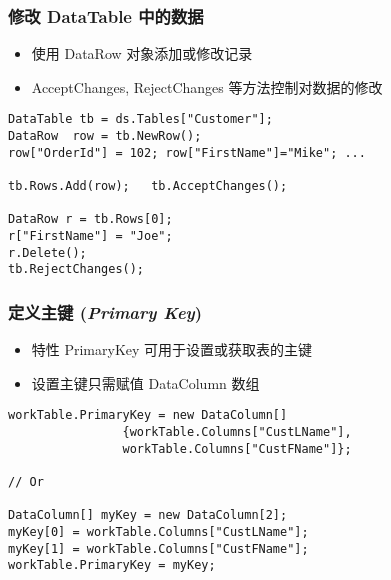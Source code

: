 \begin{frame}[fragile]
\frametitle{修改 DataTable 中的数据}
\begin{itemize}
\item 使用 DataRow 对象添加或修改记录
\item AcceptChanges, RejectChanges 等方法控制对数据的修改
\end{itemize}
\begin{lstlisting}
DataTable tb = ds.Tables["Customer"];
DataRow  row = tb.NewRow();
row["OrderId"] = 102; row["FirstName"]="Mike"; ...

tb.Rows.Add(row);   tb.AcceptChanges();

DataRow r = tb.Rows[0];
r["FirstName"] = "Joe";
r.Delete();
tb.RejectChanges();
\end{lstlisting}
\end{frame}

\begin{frame}[fragile]
\frametitle{定义主键 (\textit{Primary Key})}
\begin{itemize}
\item 特性 PrimaryKey 可用于设置或获取表的主键
\item 设置主键只需赋值 DataColumn 数组
\end{itemize}
\begin{lstlisting}
workTable.PrimaryKey = new DataColumn[] 
                {workTable.Columns["CustLName"],
                workTable.Columns["CustFName"]};

// Or 

DataColumn[] myKey = new DataColumn[2]; 
myKey[0] = workTable.Columns["CustLName"]; 
myKey[1] = workTable.Columns["CustFName"];
workTable.PrimaryKey = myKey; 

\end{lstlisting}
\end{frame}

